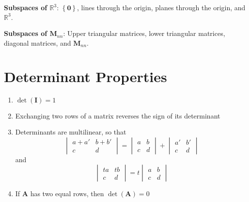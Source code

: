 \documentclass{article}
\begin{document}
\begin{multicols*}{2}
    \textbf{Subspaces of \(\mathbb{R}^3\)}: \(\left\{ \symbf{0} \right\}\),
    lines through the origin, planes through the origin, and \(\mathbb{R}^3\).

    \textbf{Subspaces of \(\symbf{M}_{nn}\)}: Upper triangular matrices,
    lower triangular matrices, diagonal matrices, and \(\symbf{M}_{nn}\).
    \section*{Determinant Properties}
    \begin{enumerate}
        \item \(\det{\left( \symbf{I} \right)}=1\)
        \item Exchanging two rows of a matrix reverses the sign of its determinant
        \item Determinants are multilinear, so that
              \begin{equation*}
                  \begin{vmatrix}
                      a+a' & b+b' \\
                      c    & d
                  \end{vmatrix}
                  =
                  \begin{vmatrix}
                      a & b \\
                      c & d
                  \end{vmatrix}
                  +
                  \begin{vmatrix}
                      a' & b' \\
                      c  & d
                  \end{vmatrix}
              \end{equation*}
              and
              \begin{equation*}
                  \begin{vmatrix}
                      ta & tb \\
                      c  & d
                  \end{vmatrix} = t
                  \begin{vmatrix}
                      a & b \\
                      c & d
                  \end{vmatrix}
              \end{equation*}
        \item If \(\symbf{A}\) has two equal rows, then \(\det{\left( \symbf{A} \right)}=0\)

\end{enumerate}
\end{multicols*}
\end{document}
